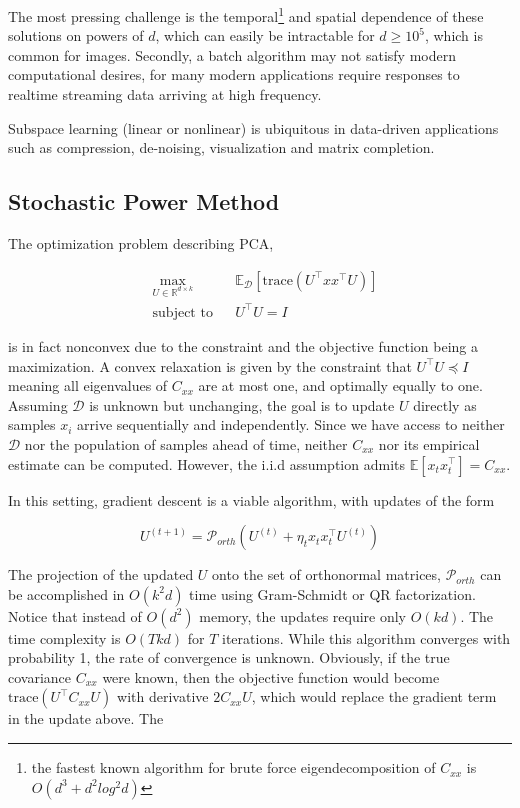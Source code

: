\documentclass[11pt,letterpaper]{article}
\begin{document}
The most pressing challenge is the temporal\footnote{the fastest known algorithm for brute force eigendecomposition of $C_{xx}$ is $O(d^3+d^2log^2d)$} and spatial dependence of these solutions on powers of $d$, which can easily be intractable for $d \geq10^5$, which is common for images. Secondly, a batch algorithm may not satisfy modern computational desires, for many modern applications require responses to realtime streaming data arriving at high frequency. 

Subspace learning (linear or nonlinear) is ubiquitous in data-driven applications such as compression, de-noising, visualization and matrix completion. 



\subsection{Stochastic Power Method}

The optimization problem describing PCA,  

\begin{equation}
\begin{aligned}
& \underset{U \in \mathbb{R}^{d \times k}}{\text{max}}
& & \mathbb{E}_{\mathcal{D}}\left[\text{trace}\left(U^{\top}xx^{\top}U\right)\right] \\
& \text{subject to}
& & U^{\top}U = I
\end{aligned}
\end{equation}

is in fact nonconvex due to the constraint and the objective function being a maximization. A convex relaxation is given by the constraint that $U^{\top}U \preceq I$ meaning all eigenvalues of $C_{xx}$ are at most one, and optimally equally to one. Assuming $\mathcal{D}$ is unknown but unchanging, the goal is to update $U$ directly as samples $x_i$ arrive sequentially and independently. Since we have access to neither $\mathcal{D}$ nor the population of samples ahead of time, neither $C_{xx}$ nor its empirical estimate can be computed. However, the i.i.d assumption admits $\mathbb{E}[ x_t x_t^{\top}] = C_{xx}$.

In this setting, gradient descent is a viable algorithm, with updates of the form 

\begin{equation}
U^{(t + 1)} = \mathcal{P}_{orth} \left( U^{(t)} + \eta_t x_t x_t^{\top}U^{(t)} \right)
\end{equation}

The projection of the updated $U$ onto the set of orthonormal matrices, $\mathcal{P}_{orth}$ can be accomplished in $O(k^2d)$ time using Gram-Schmidt or QR factorization. Notice that instead of $O(d^2)$ memory, the updates require only $O(kd)$. The time complexity is $O(Tkd)$ for $T$ iterations. While this algorithm converges with probability 1, the rate of convergence is unknown. Obviously, if the true covariance $C_{xx}$ were known, then the objective function would become $\text{trace}\left(U^{\top}C_{xx}U\right)$ with derivative $2C_{xx}U$, which would replace the gradient term in the update above.  The 
\end{document}
